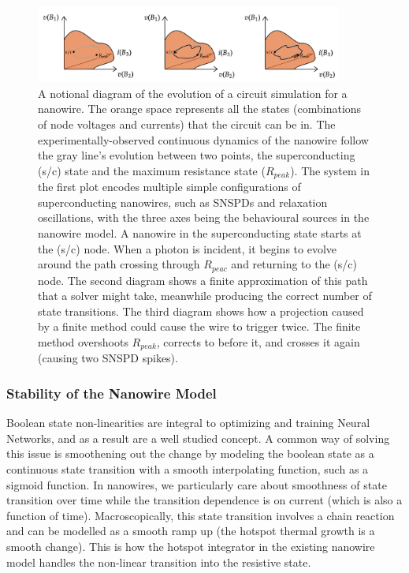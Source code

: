 \begin{figure}
    \centering
    \includegraphics[width=0.9\textwidth]{figs/statespaceevolution.png}
    \caption{A notional diagram of the evolution of a circuit simulation for a nanowire.
    The orange space represents all the states (combinations of node voltages and currents) 
    that the circuit can be in. The experimentally-observed continuous dynamics of the nanowire follow
    the gray line's evolution between two points, the superconducting (s/c) state and the maximum resistance
    state ($R_{peak}$). The system in the first plot encodes multiple simple configurations of superconducting nanowires, such as SNSPDs and relaxation oscillations, with the three axes being the behavioural sources in the nanowire model. A nanowire in the superconducting state starts at the (s/c) node. When a photon is incident, it begins to evolve around the path crossing through $R_{peac}$ and
    returning to the (s/c) node. The second diagram shows a finite approximation of this path that a solver
    might take, meanwhile producing the correct number of state transitions. The third diagram shows
    how a projection caused by a finite method could cause the wire to trigger twice. The finite method
    overshoots $R_{peak}$, corrects to before it, and crosses it again (causing two SNSPD spikes).}
    \label{fig:statespaceevolution}
\end{figure}

\subsubsection{Stability of the Nanowire Model} 

Boolean state non-linearities are integral to optimizing and training Neural Networks, and as a 
result are a well studied concept. A common way of solving this issue is smoothening out the 
change by modeling the boolean state as a continuous state transition with a smooth interpolating
function, such as a sigmoid function. In nanowires, we particularly care about smoothness of state
transition over time while the transition dependence is on current (which is also a function of time).
Macroscopically, this state transition involves a chain reaction and can be modelled as a smooth
ramp up (the hotspot thermal growth is a smooth change). This is how the hotspot integrator in the 
existing nanowire model handles the non-linear transition into the resistive state.

